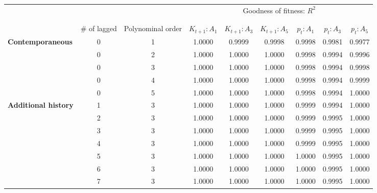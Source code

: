 \begin{tabular}{lcccccccc}
  \toprule
 \midrule
  &&&\multicolumn{6}{c}{Goodness of fitness: $R^{2}$}\\
\\[-1.8ex]\cline{4-9}\\[-1.8ex] & $\#$ of lagged & Polynominal order & $K_{t+1}: A_{1}$ & $K_{t+1}: A_{3}$ & $K_{t+1}: A_{5}$ & $p_{t}: A_{1}$ & $p_{t}: A_{3}$ & $p_{t}: A_{5}$ \\ 
   \midrule
\textbf{Contemporaneous} & 0 & 1 & 1.0000 & 0.9999 & 0.9998 & 0.9998 & 0.9981 & 0.9977 \\ 
   & 0 & 2 & 1.0000 & 1.0000 & 1.0000 & 0.9998 & 0.9994 & 0.9996 \\ 
   & 0 & 3 & 1.0000 & 1.0000 & 1.0000 & 0.9998 & 0.9994 & 0.9998 \\ 
   & 0 & 4 & 1.0000 & 1.0000 & 1.0000 & 0.9998 & 0.9994 & 0.9999 \\ 
   & 0 & 5 & 1.0000 & 1.0000 & 1.0000 & 0.9998 & 0.9994 & 1.0000 \\ 
   \midrule
\textbf{Additional history} & 1 & 3 & 1.0000 & 1.0000 & 1.0000 & 0.9999 & 0.9994 & 1.0000 \\ 
   & 2 & 3 & 1.0000 & 1.0000 & 1.0000 & 0.9999 & 0.9995 & 1.0000 \\ 
   & 3 & 3 & 1.0000 & 1.0000 & 1.0000 & 0.9999 & 0.9995 & 1.0000 \\ 
   & 4 & 3 & 1.0000 & 1.0000 & 1.0000 & 0.9999 & 0.9995 & 1.0000 \\ 
   & 5 & 3 & 1.0000 & 1.0000 & 1.0000 & 1.0000 & 0.9995 & 1.0000 \\ 
   & 6 & 3 & 1.0000 & 1.0000 & 1.0000 & 1.0000 & 0.9995 & 1.0000 \\ 
   & 7 & 3 & 1.0000 & 1.0000 & 1.0000 & 1.0000 & 0.9995 & 1.0000 \\ 
   \midrule
 \bottomrule
\end{tabular}

